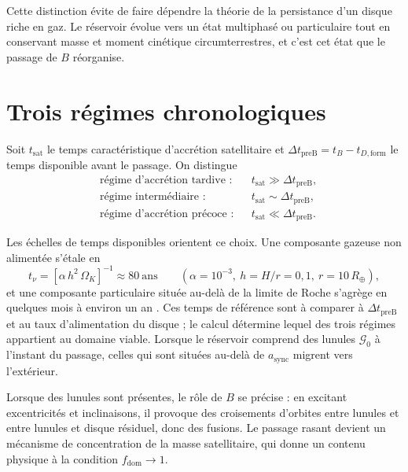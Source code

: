 \documentclass[11pt,a4paper,openany]{report}
\newcommand{\Rt}{R_{\oplus}}
\begin{document}
\begin{lecture}
Cette distinction évite de faire dépendre la théorie de la persistance d'un disque riche en gaz.
Le réservoir évolue vers un état multiphasé ou particulaire tout en conservant masse et moment
cinétique circumterrestres, et c'est cet état que le passage de $B$ réorganise.
\end{lecture}


\section{Trois régimes chronologiques}
\label{sec:regimes}

Soit $t_{\mathrm{sat}}$ le temps caractéristique d'accrétion satellitaire et
$\Delta t_{\mathrm{preB}}=t_B-t_{D,\mathrm{form}}$ le temps disponible avant le passage. On
distingue
\begin{align}
&\text{régime d'accrétion tardive :} && t_{\mathrm{sat}}\gg\Delta t_{\mathrm{preB}},
\label{eq:tardif}\\
&\text{régime intermédiaire :} && t_{\mathrm{sat}}\sim\Delta t_{\mathrm{preB}},
\label{eq:interm}\\
&\text{régime d'accrétion précoce :} && t_{\mathrm{sat}}\ll\Delta t_{\mathrm{preB}}.
\label{eq:precoce}
\end{align}

Les échelles de temps disponibles orientent ce choix. Une composante gazeuse non alimentée
s'étale en
\begin{equation}
t_\nu=\left[\alpha\,h^2\,\Omega_K\right]^{-1}\approx80\ \text{ans}
\qquad(\alpha=10^{-3},\ h=H/r=0{,}1,\ r=10\,\Rt),
\label{eq:tnu-num}
\end{equation}
et une composante particulaire située au-delà de la limite de Roche s'agrège en quelques mois
à environ un an \cite{Ida1997,Kokubo2000}. Ces temps de référence sont à comparer à
$\Delta t_{\mathrm{preB}}$ et au taux d'alimentation du disque ; le calcul détermine lequel des trois
régimes appartient au domaine viable. Lorsque le réservoir comprend des lunules
$\mathcal{G}_0$ à l'instant du passage, celles qui sont situées au-delà de $a_{\mathrm{sync}}$ migrent
vers l'extérieur.

\begin{lecture}
Lorsque des lunules sont présentes, le rôle de $B$ se précise : en excitant excentricités et inclinaisons, il provoque
des croisements d'orbites entre lunules et entre lunules et disque résiduel, donc des fusions.
Le passage rasant devient un mécanisme de concentration de la masse satellitaire, qui donne un
contenu physique à la condition $f_{\mathrm{dom}}\to1$.
\end{lecture}
\end{document}
